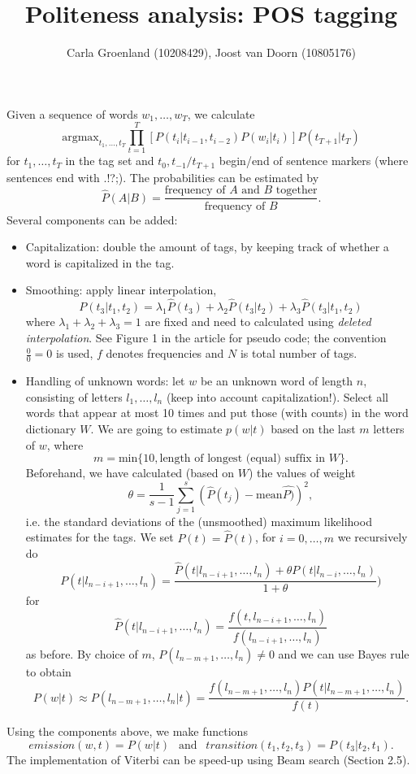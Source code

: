 \documentclass[11pt, english]{article}
\title{Politeness analysis: POS tagging}
\author{Carla Groenland (10208429), 
Joost van Doorn (10805176)}
\begin{document}
\maketitle
Given a sequence of words $w_1,\dots,w_T$, we calculate
\[
\text{argmax}_{t_1,\dots,t_T} \prod_{t=1}^T [P(t_i|t_{i-1},t_{i-2})P(w_i|t_i)]P(t_{T+1}|t_T)
\]
for $t_1,\dots,t_T$ in the tag set and $t_0,t_{-1}/t_{T+1}$ begin/end of sentence markers (where sentences end with .!?;). The probabilities can be estimated by 
\[
\hat{P}(A|B) = \frac{\text{frequency of $A$ and $B$ together}}{\text{frequency of }B}.
\]
Several components can be added:
\begin{itemize}
\item Capitalization: double the amount of tags, by keeping track of whether a word is capitalized in the tag.
\item Smoothing: apply linear interpolation,
\[
P(t_3|t_1,t_2)=\lambda_1\hat{P}(t_3)+\lambda_2\hat{P}(t_3|t_2)+\lambda_3\hat{P}(t_3|t_1,t_2)
\]
where $\lambda_1+\lambda_2+\lambda_3=1$ are fixed and need to calculated using \emph{deleted interpolation}. See Figure 1 in the article for pseudo code; the convention $\frac00=0$ is used, $f$ denotes frequencies and $N$ is total number of tags.
\item Handling of unknown words: let $w$ be an unknown word of length $n$, consisting of letters $l_1,\dots,l_n$ (keep into account capitalization!). Select all words that appear at most 10 times and put those (with counts) in the word dictionary $W$. We are going to estimate $p(w|t)$ based on the last $m$ letters of $w$, where 
\[
m = \text{min}\{10,\text{length of longest (equal) suffix in $W$}\}.
\]
Beforehand, we have calculated (based on $W$) the values of weight
\[
\theta= \frac1{s-1}\sum_{j=1}^s (\hat{P}(t_j)- \text{mean}\hat{P)})^2,
\]
i.e. the standard deviations of the (unsmoothed) maximum likelihood estimates for the tags. We set $P(t)=\hat{P}(t)$, for $i=0,\dots,m$ we recursively do
\[
P(t|l_{n-i+1},\dots, l_n)=\frac{\hat{P}(t|l_{n-i+1},\dots,l_n)+\theta P(t|l_{n-i},\dots,l_n)}{1+\theta})
\]
for 
\[
\hat{P}(t|l_{n-i+1},\dots,l_n)=\frac{f(t,l_{n-i+1},\dots,l_n)}{f(l_{n-i+1},\dots,l_n)}
\]
as before. By choice of $m$, $P(l_{n-m+1},\dots,l_n)\neq 0$ and we can use Bayes rule to obtain
\[
P(w|t) \approx P(l_{n-m+1},\dots,l_n|t) = \frac{f(l_{n-m+1},\dots,l_n)P(t|l_{n-m+1},\dots,l_n)}{f(t)}.
\]
\end{itemize}
Using the components above, we make functions
\[
emission(w,t) = P(w|t) ~~ \text{ and } ~~ transition(t_1,t_2,t_3)=P(t_3|t_2,t_1).
\]
The implementation of Viterbi can be speed-up using Beam search (Section 2.5).
\end{document}
